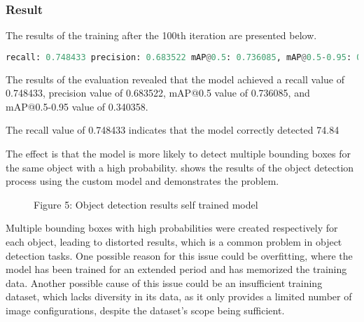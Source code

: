 \subsubsection{Result }

The results of the training after the 100th iteration are presented below.

\begin{lstlisting}[language=python]
    recall: 0.748433 precision: 0.683522 mAP@0.5: 0.736085, mAP@0.5-0.95: 0.340358
\end{lstlisting}

The results of the evaluation revealed that the model achieved a recall value of 0.748433, precision value of 0.683522, mAP@0.5 value of 0.736085, and mAP@0.5-0.95 value of 0.340358. 

The recall value of 0.748433 indicates that the model correctly detected 74.84%

The effect is that the model is more likely to detect multiple bounding boxes for the same object with a high probability.  shows the results of the object detection process using the custom model and demonstrates the problem. 

\begin{figure}[!h]
    \centering
    \caption{Figure 5: Object detection results self trained model }
    \label{fig:trained_model_results}
\end{figure}

Multiple bounding boxes with high probabilities were created respectively for each object, leading to distorted results, which is a common problem in object detection tasks. One possible reason for this issue could be overfitting, where the model has been trained for an extended period and has memorized the training data. Another possible cause of this issue could be an insufficient training dataset, which lacks diversity in its data, as it only provides a limited number of image configurations, despite the dataset's scope being sufficient.

